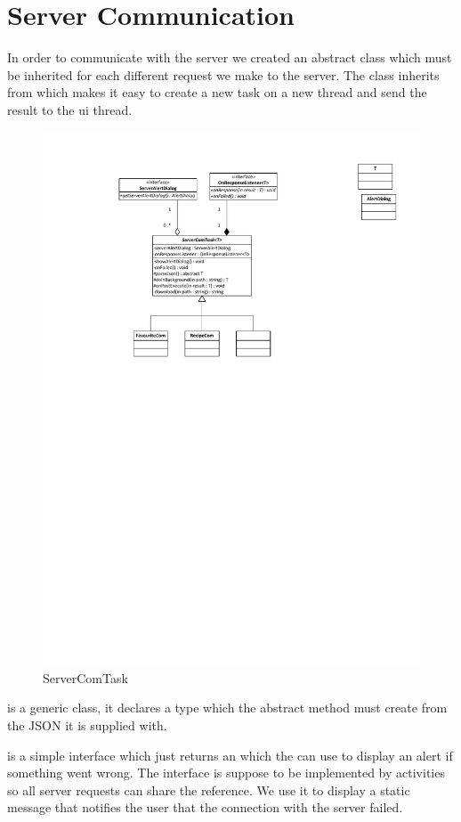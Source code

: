\section{Server Communication}
In order to communicate with the server we created an abstract class which must be inherited for each different request we make to the server. The class inherits from  which makes it easy to create a new task on a new thread and send the result to the \ac{ui} thread.

\begin{figure}[H]
\centering
\includegraphics[width=0.7\linewidth, page=2]{img/servercomtask.pdf}
\caption{ServerComTask}
\label{fig:servercomtask}
\end{figure}
 is a generic class, it declares a type which the abstract method  must create from the JSON it is supplied with.

 is a simple interface which just returns an  which the  can use to display an alert if something went wrong. The interface is suppose to be implemented by activities so all server requests can share the  reference. We use it to display a static message that notifies the user that the connection with the server failed.

